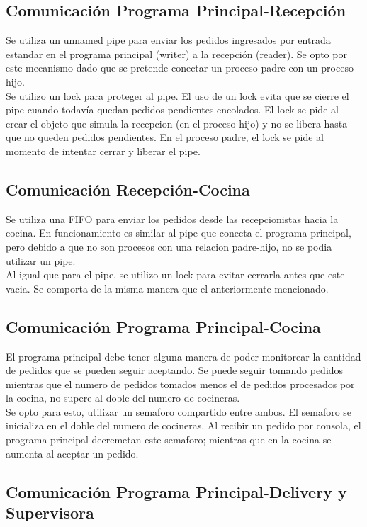 \documentclass[11pt,spanish,a4paper,openany,notitlepage]{article}
\begin{document}
\subsection{Comunicación Programa Principal-Recepción}

Se utiliza un unnamed pipe para enviar los pedidos ingresados por entrada estandar en el programa 
principal (writer) a la recepción (reader). Se opto por este mecanismo dado que se pretende 
conectar un proceso padre con un proceso hijo.\\ 
Se utilizo un lock para proteger al pipe. El uso de un lock evita que se cierre el pipe cuando 
todavía quedan pedidos pendientes encolados. El lock se pide al crear el objeto que simula la 
recepcion (en el proceso hijo) y no se libera hasta que no queden pedidos pendientes. En el proceso 
padre, el lock se pide al momento de intentar cerrar y liberar el pipe.

\subsection{Comunicación Recepción-Cocina}

Se utiliza una FIFO para enviar los pedidos desde las recepcionistas hacia la cocina. En 
funcionamiento es similar al pipe que conecta el programa principal, pero debido a que no son 
procesos con una relacion padre-hijo, no se podia utilizar un pipe.\\
Al igual que para el pipe, se utilizo un lock para evitar cerrarla antes que este vacia. Se 
comporta de la misma manera que el anteriormente mencionado.

\subsection{Comunicación Programa Principal-Cocina}

El programa principal debe tener alguna manera de poder monitorear la cantidad de pedidos que se 
pueden seguir aceptando. Se puede seguir tomando pedidos mientras que el numero de pedidos tomados 
menos el de pedidos procesados por la cocina, no supere al doble del numero de cocineras.\\
Se opto para esto, utilizar un semaforo compartido entre ambos. El semaforo se inicializa en el 
doble del numero de cocineras. Al recibir un pedido por consola, el programa principal decremetan 
este semaforo; mientras que en la cocina se aumenta al aceptar un pedido.

\subsection{Comunicación Programa Principal-Delivery y Supervisora}
\end{document}
